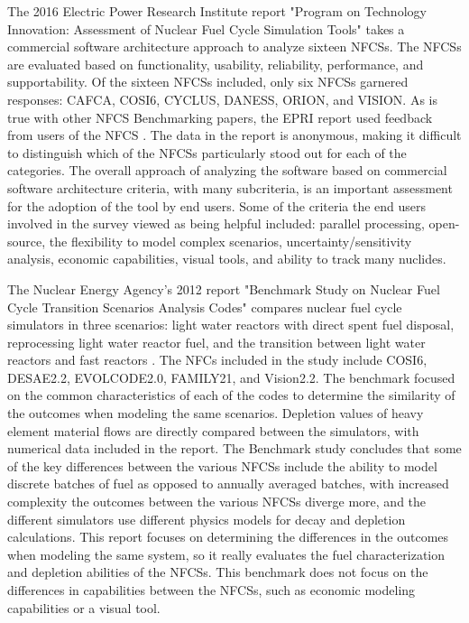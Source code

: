 \documentclass{article}                                                                           %
\begin{document}
\begin{linenumbers}
The 2016 Electric Power Research Institute report "Program on Technology Innovation: Assessment of Nuclear Fuel Cycle Simulation Tools" takes a commercial software architecture approach to analyze sixteen NFCSs.  The NFCSs are evaluated based on functionality, usability, reliability, performance, and supportability. Of the sixteen NFCSs included, only six NFCSs garnered responses: CAFCA, COSI6, CYCLUS, DANESS, ORION, and VISION. As is true with other NFCS Benchmarking papers, the EPRI report used feedback from users of the NFCS \cite{EPRI2016}.  The data in the report is anonymous, making it difficult to distinguish which of the NFCSs particularly stood out for each of the categories. The overall approach of analyzing the software based on commercial software architecture criteria, with many subcriteria, is an important assessment for the adoption of the tool by end users. Some of the criteria the end users involved in the survey viewed as being helpful included: parallel processing, open-source, the flexibility to model complex scenarios, uncertainty/sensitivity analysis, economic capabilities, visual tools, and ability to track many nuclides.

The Nuclear Energy Agency's 2012 report "Benchmark Study on Nuclear Fuel Cycle Transition Scenarios Analysis Codes" compares nuclear fuel cycle simulators in three scenarios: light water reactors with direct spent fuel disposal, reprocessing light water reactor fuel, and the transition between light water reactors and fast reactors \cite{NEA2012}. The NFCs included in the study include COSI6, DESAE2.2, EVOLCODE2.0, FAMILY21, and Vision2.2. The benchmark focused on the common characteristics of each of the codes to determine the similarity of the outcomes when modeling the same scenarios. Depletion values of heavy element material flows are directly compared between the simulators, with numerical data included in the report. The Benchmark study concludes that some of the key differences between the various NFCSs include the ability to model discrete batches of fuel as opposed to annually averaged batches, with increased complexity the outcomes between the various NFCSs diverge more, and the different simulators use different physics models for decay and depletion calculations. This report focuses on determining the differences in the outcomes when modeling the same system, so it really evaluates the fuel characterization and depletion abilities of the NFCSs. This benchmark does not focus on the differences in capabilities between the NFCSs, such as economic modeling capabilities or a visual tool.



\end{linenumbers}
\end{document}

